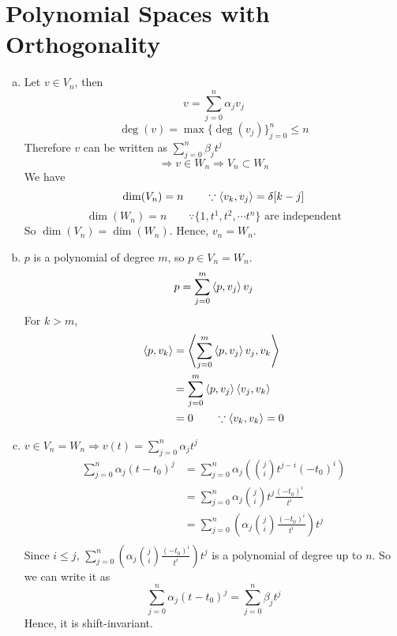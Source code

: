 \section{Polynomial Spaces with Orthogonality}\label{sec:p3}

\begin{enumerate}[(a)]
\item Let $v \in V_n$, then \[v = \sum_{j=0}^{n}\alpha_j v_j\]
\[\deg(v) = \max\{\deg(v_j)\}_{j=0}^n \leq n\]
Therefore $v$ can be written as $\sum_{j=0}^{n} \beta_j t^j$
\[\Rightarrow v\in W_n \Rightarrow V_n \subset W_n\]
We have
\[\dim(V_n) = n \qquad \because \left\langle v_k, v_j \right\rangle = \delta[k-j]\]
\[\dim(W_n) = n \qquad \because \{1, t^1, t^2, \cdots t^n\} \text{ are independent}\]
So $\dim(V_n) = \dim(W_n)$. Hence, $v_n = W_n$.

\item $p$ is a polynomial of degree $m$, so $p \in V_n = W_n$.
\[p = \sum_{j=0}^{m}\left\langle p, v_j \right\rangle v_j\]
For $k>m$,
\begin{align*}
	\left\langle p, v_k \right\rangle
	&= \left\langle \sum_{j=0}^{m}\left\langle p, v_j \right\rangle v_j, v_k \right\rangle \\
	&= \sum_{j=0}^{m} \left\langle p, v_j \right\rangle \left\langle v_j, v_k \right\rangle \\
	&= 0 \qquad \because \left\langle v_k, v_k \right\rangle = 0
\end{align*}

\item $v \in V_n = W_n \Rightarrow v(t) = \sum_{j=0}^{n}\alpha_j t^j$
\begin{align*}
	\sum_{j=0}^{n} \alpha_j (t-t_0)^j 
	&= \sum_{j=0}^{n} \alpha_j \left(\binom{j}{i}t^{j-i}(-t_0)^i\right) \\
	&= \sum_{j=0}^{n} \alpha_j \binom{j}{i}t^{j}\frac{(-t_0)^i}{t^i} \\
	&= \sum_{j=0}^{n} \left(\alpha_j \binom{j}{i}\frac{(-t_0)^i}{t^i}\right) t^{j}\\
\end{align*}
Since $i \leq j$, $\sum_{j=0}^{n} \left(\alpha_j \binom{j}{i}\frac{(-t_0)^i}{t^i}\right) t^{j}$ is a polynomial of degree up to $n$. So we can write it as
\[\sum_{j=0}^{n} \alpha_j (t-t_0)^j = \sum_{j=0}^{n} \beta_j t^j\]
Hence, it is shift-invariant.
\end{enumerate}